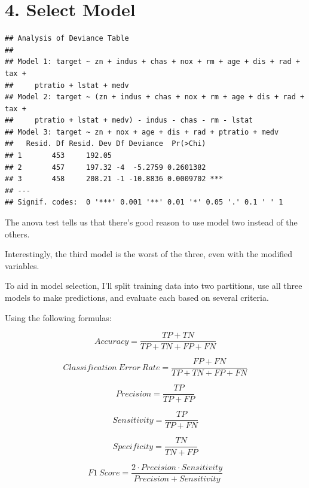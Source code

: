 \documentclass[]{article}
\begin{document}
\section{4. Select Model}\label{select-model}

\begin{verbatim}
## Analysis of Deviance Table
## 
## Model 1: target ~ zn + indus + chas + nox + rm + age + dis + rad + tax + 
##     ptratio + lstat + medv
## Model 2: target ~ (zn + indus + chas + nox + rm + age + dis + rad + tax + 
##     ptratio + lstat + medv) - indus - chas - rm - lstat
## Model 3: target ~ zn + nox + age + dis + rad + ptratio + medv
##   Resid. Df Resid. Dev Df Deviance  Pr(>Chi)    
## 1       453     192.05                          
## 2       457     197.32 -4  -5.2759 0.2601382    
## 3       458     208.21 -1 -10.8836 0.0009702 ***
## ---
## Signif. codes:  0 '***' 0.001 '**' 0.01 '*' 0.05 '.' 0.1 ' ' 1
\end{verbatim}

The anova test tells us that there's good reason to use model two
instead of the others.

Interestingly, the third model is the worst of the three, even with the
modified variables.

To aid in model selection, I'll split training data into two partitions,
use all three models to make predictions, and evaluate each based on
several criteria.

Using the following formulas:

\begin{equation}
Accuracy = \frac{TP + TN}{TP + TN + FP + FN}
\end{equation}

\begin{equation}
Classification \ Error \ Rate = \frac{FP + FN}{TP + TN + FP + FN}
\end{equation}

\begin{equation}
Precision = \frac{TP}{TP + FP}
\end{equation}

\begin{equation}
Sensitivity = \frac{TP}{TP + FN}
\end{equation}

\begin{equation}
Specificity = \frac{TN}{TN + FP}
\end{equation}

\begin{equation}
F1 \ Score = \frac{2\cdot Precision \cdot Sensitivity}{Precision + Sensitivity}
\end{equation}
\end{document}
